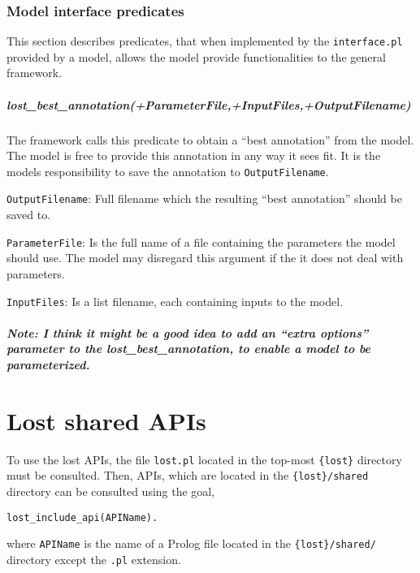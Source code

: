 \documentclass{book}
\begin{document}
\subsection{Model interface predicates}

This section describes predicates, that when implemented by 
the \texttt{interface.pl} provided by a model, allows the 
model provide functionalities to the  general framework.

\noindent
\paragraph{lost\_best\_annotation(+ParameterFile,+InputFiles,+OutputFilename)}

The framework calls this predicate to obtain a ``best annotation''
from the model. The model is free to provide this annotation in
any way it sees fit. It is the models responsibility to save the
annotation to \texttt{OutputFilename}.

\texttt{OutputFilename}: Full filename which the resulting ``best
  annotation'' should be saved to.

\texttt{ParameterFile}: Is the full name of a file containing the
parameters the model should use. The model may disregard this argument
if the it does not deal with parameters. 

\texttt{InputFiles}: Is a list filename, each containing inputs to the
model.

\paragraph{Note: I think it might be a good idea to add an ``extra
  options'' parameter to the lost\_best\_annotation, to enable a model
  to be parameterized.}

\chapter{Lost shared APIs}

To use the lost APIs, the file \texttt{lost.pl} located in the
top-most \texttt{\{lost\}} directory must be consulted. Then,
APIs, which are located in the \texttt{\{lost\}/shared} directory
can be consulted using the goal, 
\begin{verbatim}
lost_include_api(APIName).
\end{verbatim}

\noindent
where \texttt{APIName} is the name of a Prolog file located
in the \texttt{\{lost\}/shared/} directory except the \texttt{.pl}
extension.
\end{document}

